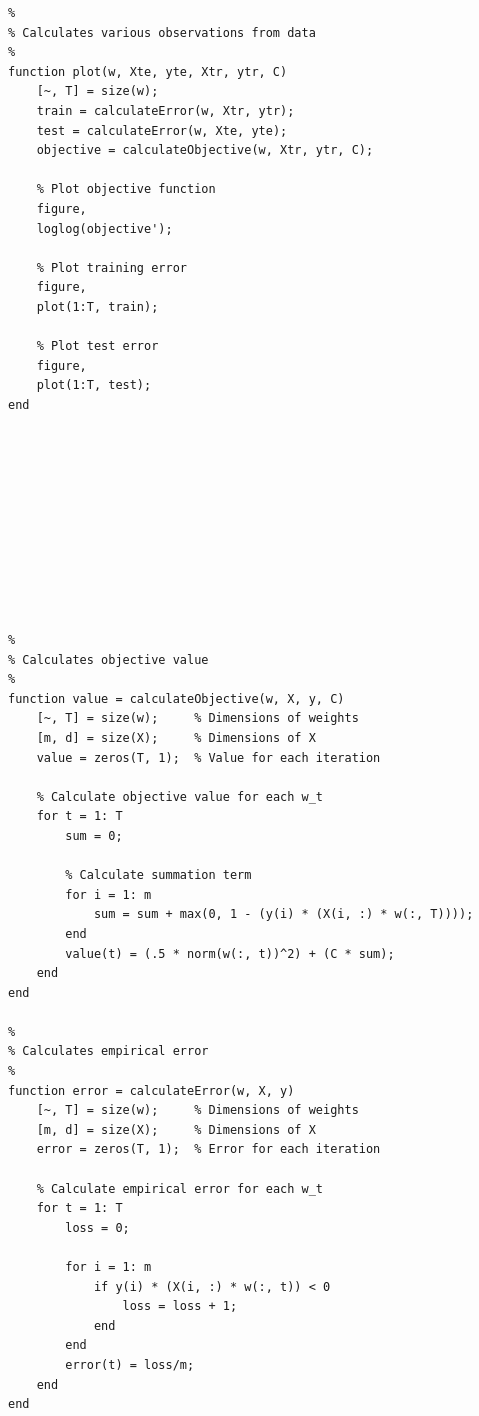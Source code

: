 \documentclass[11pt, oneside]{article}   	%
\begin{document}
\begin{verbatim}
%
% Calculates various observations from data
%
function plot(w, Xte, yte, Xtr, ytr, C)
    [~, T] = size(w);
    train = calculateError(w, Xtr, ytr);
    test = calculateError(w, Xte, yte);
    objective = calculateObjective(w, Xtr, ytr, C);
    
    % Plot objective function    
    figure,
    loglog(objective');
    
    % Plot training error
    figure,
    plot(1:T, train);

    % Plot test error
    figure,
    plot(1:T, test);
end











%
% Calculates objective value
%
function value = calculateObjective(w, X, y, C)
    [~, T] = size(w);     % Dimensions of weights
    [m, d] = size(X);     % Dimensions of X
    value = zeros(T, 1);  % Value for each iteration
    
    % Calculate objective value for each w_t
    for t = 1: T
        sum = 0;
        
        % Calculate summation term
        for i = 1: m
            sum = sum + max(0, 1 - (y(i) * (X(i, :) * w(:, T))));
        end
        value(t) = (.5 * norm(w(:, t))^2) + (C * sum);
    end    
end

%
% Calculates empirical error
%
function error = calculateError(w, X, y)
    [~, T] = size(w);     % Dimensions of weights
    [m, d] = size(X);     % Dimensions of X
    error = zeros(T, 1);  % Error for each iteration
    
    % Calculate empirical error for each w_t
    for t = 1: T
        loss = 0;
        
        for i = 1: m
            if y(i) * (X(i, :) * w(:, t)) < 0
                loss = loss + 1;
            end
        end
        error(t) = loss/m;
    end
end
\end{verbatim}

\newpage{}
\end{document}
